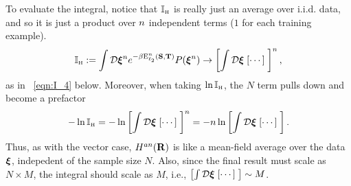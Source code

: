 To evaluate the integral, notice that $\mathbb{I}_{\text{\tiny H}}$ is really just an average over i.i.d. data, and so it is just a product over $n$ independent terms ($1$ for each training example).
\begin{align}
\mathbb{I}_{\text{\tiny H}} := \int\mathcal{D}\boldsymbol{\xi}^{n}  e^{-\beta \mathbf{\mathrm{E}}^{n}_{\ell_2}({\mathbf{S}},{\mathbf{T}})} P(\boldsymbol{\xi}^{n})  \rightarrow\left[\int\mathcal{D}\boldsymbol{\xi} \;[\cdots]\; \right]^{n} ,
\end{align}
as in \EQN~\ref{eqn:I_4} below.
Moreover, when taking $\ln \mathbb{I}_{\text{\tiny H}}$, the $N$ term pulls down and become a prefactor
\begin{align}
-\ln \mathbb{I}_{\text{\tiny H}} = -\ln\left[\int\mathcal{D}\boldsymbol{\xi} \;[\cdots]\; \right]^{n}= -n\ln\left[\int\mathcal{D}\boldsymbol{\xi} \;[\cdots]\; \right] .
\end{align}
Thus, as with the vector case, $H^{an}(\mathbf{R})$ is like a mean-field average over the data $\boldsymbol{\xi}$, indepedent of the sample size $N$.
Also, since the final result must scale as $N\times M$, the integral should scale as $M$, i.e.,
$\left[\int\mathcal{D}\boldsymbol{\xi} \;[\cdots]\; \right]\sim M$.


